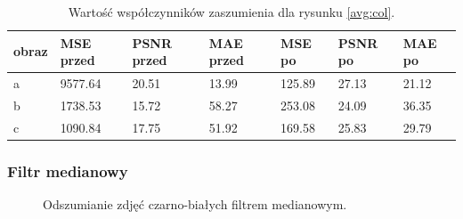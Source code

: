 \documentclass{classrep}
\begin{document}
\begin{table}[H]
	\begin{center}
		\begin{tabular}{|l|l|l|l|l|l|l|}
			\hline
			obraz & MSE przed & PSNR przed & MAE przed & MSE po & PSNR po & MAE po \\
			\hline
			a & 9577.64 & 20.51 & 13.99 & 125.89 & 27.13 & 21.12 \\
			b & 1738.53 & 15.72 & 58.27 & 253.08 & 24.09 & 36.35 \\
			c & 1090.84 & 17.75 & 51.92 & 169.58 & 25.83 & 29.79\\
			\hline
		\end{tabular}
		\caption{Wartość współczynników zaszumienia dla rysunku \ref{avg:col}.}
			\label{avgtab:col}
	\end{center}

\end{table}





\subsubsection{Filtr medianowy}

 \begin{figure}[H]
  \centering
  \caption{Odszumianie zdjęć czarno-białych filtrem medianowym.}
  \label{men:bw}
\end{figure}
\end{document}
